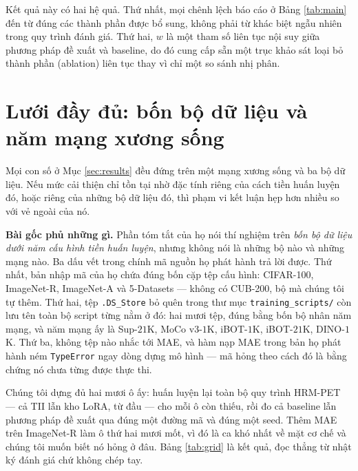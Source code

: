 \documentclass[11pt,a4paper]{article}
\begin{document}
Kết quả này có hai hệ quả. Thứ nhất, mọi chênh lệch báo cáo ở Bảng \ref{tab:main}
đến từ đúng các thành phần được bổ sung, không phải từ khác biệt ngẫu nhiên
trong quy trình đánh giá. Thứ hai, $w$ là một tham số liên tục nội suy giữa
phương pháp đề xuất và baseline, do đó cung cấp sẵn một trục khảo sát loại bỏ
thành phần (ablation) liên tục thay vì chỉ một so sánh nhị phân.

\section{Lưới đầy đủ: bốn bộ dữ liệu và năm mạng xương sống}
\label{sec:grid}

Mọi con số ở Mục \ref{sec:results} đều đứng trên một mạng xương sống và ba bộ
dữ liệu. Nếu mức cải thiện chỉ tồn tại nhờ đặc tính riêng của cách tiền huấn
luyện đó, hoặc riêng của những bộ dữ liệu đó, thì phạm vi kết luận hẹp hơn
nhiều so với vẻ ngoài của nó.

\textbf{Bài gốc phủ những gì.} Phần tóm tắt của họ nói thí nghiệm trên
\emph{bốn bộ dữ liệu dưới năm cấu hình tiền huấn luyện}, nhưng không nói là
những bộ nào và những mạng nào. Ba dấu vết trong chính mã nguồn họ phát hành
trả lời được. Thứ nhất, bản nhập mã của họ chứa đúng bốn cặp tệp cấu hình:
CIFAR-100, ImageNet-R, ImageNet-A và 5-Datasets --- không có CUB-200, bộ mà
chúng tôi tự thêm. Thứ hai, tệp \texttt{.DS\_Store} bỏ quên trong thư mục
\texttt{training\_scripts/} còn lưu tên toàn bộ script từng nằm ở đó: hai mươi
tệp, đúng bằng bốn bộ nhân năm mạng, và năm mạng ấy là Sup-$21$K, MoCo v3-$1$K,
iBOT-$1$K, iBOT-$21$K, DINO-$1$K. Thứ ba, không tệp nào nhắc tới MAE, và hàm
nạp MAE trong bản họ phát hành ném \texttt{TypeError} ngay dòng dựng mô hình
--- mã hỏng theo cách đó là bằng chứng nó chưa từng được thực thi.

Chúng tôi dựng đủ hai mươi ô ấy: huấn luyện lại toàn bộ quy trình HRM-PET
--- cả TII lẫn kho LoRA, từ đầu --- cho mỗi ô còn thiếu, rồi đo cả baseline lẫn
phương pháp đề xuất qua đúng một đường mã và đúng một seed. Thêm MAE trên
ImageNet-R làm ô thứ hai mươi mốt, vì đó là ca khó nhất về mặt cơ chế và
chúng tôi muốn biết nó hỏng ở đâu. Bảng \ref{tab:grid} là kết quả, đọc thẳng
từ nhật ký đánh giá chứ không chép tay.
\end{document}
